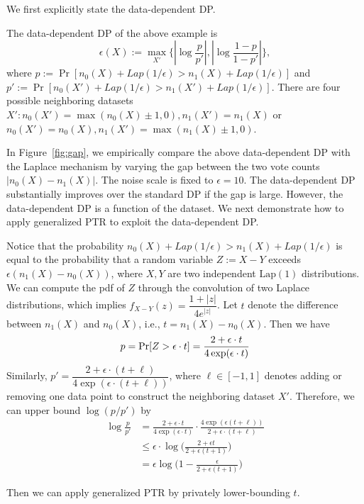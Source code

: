 We first explicitly state the data-dependent DP.
\begin{theorem}\label{thm: binary_vote}
The data-dependent DP of the above example is 
\[\epsilon(X):= \max_{X'}\{ |\log\frac{p}{p'}|, |\log\frac{1-p}{1-p'}|\},\] where $p:=\Pr[n_0(X) + Lap(1/\epsilon)> n_1(X) +Lap(1/\epsilon)]$ and $p':= \Pr[n_0(X') + Lap(1/\epsilon)> n_1(X')+Lap(1/\epsilon)]$. There are four possible neighboring datasets $X': n_0(X')=\max(n_0(X)\pm 1,0), n_1(X')=n_1(X)$ or  $n_0(X')=n_0(X), n_1(X')=\max(n_1(X)\pm 1,0)$.
\end{theorem}
In Figure~\ref{fig:gap}, we empirically compare the above data-dependent DP with the Laplace mechanism by varying the gap between the two vote counts $|n_0(X)-n_1(X)|$.  The noise scale is fixed to $\epsilon=10$.
The data-dependent DP substantially improves over the standard DP if the gap is large. However, the data-dependent DP is a function of the dataset. We next demonstrate how to apply generalized PTR to exploit the data-dependent DP.


Notice that the probability $n_0(X) + Lap(1/\epsilon)> n_1(X) +Lap(1/\epsilon)$  is equal to the probability that a random variable $Z:= X-Y$ exceeds $\epsilon(n_1(X)- n_0(X))$, where $X, Y$ are two independent $\text{Lap}(1)$ distributions. We can compute the pdf of $Z$ through the convolution of two Laplace distributions, which implies $f_{X-Y}(z) = \dfrac{1+|z|}{4e^{|z|}}$.  Let $t$ denote the difference between $n_1(X)$ and $n_0(X)$, i.e., $t=n_1(X)-n_0(X)$. Then we have
\[  p = \mathrm{Pr}[Z>\epsilon \cdot t] = \frac{2+\epsilon \cdot t}{4 \exp(\epsilon \cdot t)}\]
Similarly, $p' =\dfrac{2+\epsilon \cdot (t+ \ell)}{4 \exp(\epsilon \cdot (t+\ell))} $, where $\ell\in[-1,1]$ denotes adding or removing one data point to construct the neighboring dataset $X'$.
Therefore, we can upper bound $\log(p/{p'})$ by
\begin{align*}
\log\frac{p}{p'} &= \frac{2 +\epsilon \cdot t}{4\exp(\epsilon \cdot t)}\cdot \frac{4\exp(\epsilon(t+\ell))}{2+\epsilon\cdot ( t+\ell)} \\ &\leq \epsilon \cdot \log\bigg(\frac{2+\epsilon t}{2+\epsilon(t+1)}\bigg) \\ &=\epsilon \log\bigg(1- \frac{\epsilon}{2+\epsilon(t+1)} \bigg)
\end{align*}


Then we can apply  generalized PTR by privately lower-bounding $t$.


